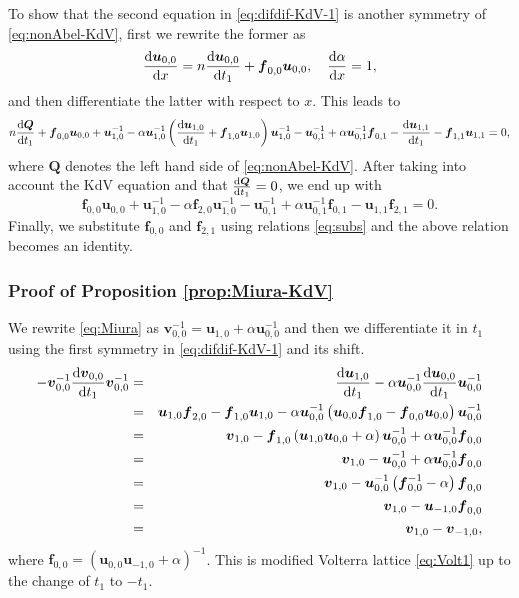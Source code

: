 \documentclass[dvips,10pt]{article}
\newcommand{\bs}{\boldsymbol}
\newcommand{\bsu}{ {\bs{u}}}
\newcommand{\bsf}{ {\bs{f}}}
\newcommand{\bsv}{ {\bs{v}}}
\theoremstyle{remark} %
\begin{document}
	To show that the second equation in \eqref{eq:difdif-KdV-1} is another symmetry of \eqref{eq:nonAbel-KdV}, first we rewrite the former as
	\begin{equation}\label{eq:mast-sym-KdV-v2}
		\frac{{\rm{d}} {\bs{u}}_{0,0}}{{\rm{d}} x} =  n \frac{{\rm{d}} {\bs{u}}_{0,0}}{{\rm{d}} t_1}  + {\bs{f}}_{0,0}  {\bs{u}}_{0,0}, ~~~ 	\frac{{\rm{d}} \alpha}{{\rm{d}} x} = 1,
	\end{equation}
	and then differentiate the latter with respect to $x$. This leads to 
	$$ n \frac{{\rm{d}} {\bs{Q}}}{{\rm{d}} t_1} + \bsf_{0,0} \bsu_{0,0} + \bsu_{1,0}^{-1} - \alpha \bsu_{1,0}^{-1}\left(\frac{{\rm{d}} \bsu_{1,0}}{{\rm{d}} t_1} + \bsf_{1,0} \bsu_{1,0}\right) \bsu_{1,0}^{-1} - \bsu_{0,1}^{-1} + \alpha \bsu_{0,1}^{-1} \bsf_{0,1} - \frac{{\rm{d}} \bsu_{1,1}}{{\rm{d}} t_1} - \bsf_{1,1} \bsu_{1,1} = 0, $$
	where ${\bs{Q}}$ denotes the left hand side of \eqref{eq:nonAbel-KdV}. After taking into account the KdV equation and that $ \frac{{\rm{d}} {\bs{Q}}}{{\rm{d}} t_1} =0$, we end up with
	$$  \bsf_{0,0} \bsu_{0,0} + \bsu_{1,0}^{-1} - \alpha \bsf_{2,0} \bsu_{1,0}^{-1} - \bsu_{0,1}^{-1} + \alpha \bsu_{0,1}^{-1} \bsf_{0,1}  - \bsu_{1,1} \bsf_{2,1} = 0.$$
	Finally, we substitute $\bsf_{0,0}$ and $\bsf_{2,1}$ using relations \eqref{eq:subs} and the above relation becomes an identity.
	
	
	\subsubsection*{Proof of Proposition \ref{prop:Miura-KdV}}
	
	We rewrite \eqref{eq:Miura} as $\bsv_{0,0}^{-1} = \bsu_{1,0} + \alpha \bsu_{0,0}^{-1}$ and then we differentiate it in $t_1$ using the first symmetry in \eqref{eq:difdif-KdV-1} and its shift.
	\begin{eqnarray*}
		-\bsv_{0,0}^{-1} \frac{{\rm{d}} \bsv_{0,0}}{{\rm{d}} t_1} \bsv_{0,0}^{-1} &=&  \frac{{\rm{d}} {\bs{u}}_{1,0}}{{\rm{d}} t_1} - \alpha \bsu_{0,0}^{-1} \frac{{\rm{d}} {\bs{u}}_{0,0}}{{\rm{d}} t_1} \bsu_{0,0}^{-1}\\
		&=& \bsu_{1,0} \bsf_{2,0} - \bsf_{1,0} \bsu_{1,0} - \alpha \bsu_{0,0}^{-1} \left(\bsu_{0,0} \bsf_{1,0} - \bsf_{0,0} \bsu_{0,0}\right)  \bsu_{0,0}^{-1}  \\
		&=& \bsv_{1,0} - \bsf_{1,0} \left(\bsu_{1,0}\bsu_{0,0}+ \alpha\right) \bsu_{0,0}^{-1}   + \alpha \bsu_{0,0}^{-1} \bsf_{0,0} \\
		&=& \bsv_{1,0} -  \bsu_{0,0}^{-1}   + \alpha \bsu_{0,0}^{-1} \bsf_{0,0}\\ 
		&=& \bsv_{1,0} -  \bsu_{0,0}^{-1}\left( \bsf_{0,0}^{-1} - \alpha\right)\bsf_{0,0}\\
		&=& \bsv_{1,0} -  \bsu_{-1,0}\bsf_{0,0} \\
		&=& \bsv_{1,0} -  \bsv_{-1,0},
	\end{eqnarray*}
	where ${\bs{f}}_{0,0} = ( {\bs{u}}_{0,0} {\bs{u}}_{-1,0}+\alpha)^{-1}$. This is modified Volterra lattice \eqref{eq:Volt1} up to the change of $t_1$ to $-t_1$.
	
\end{document}
